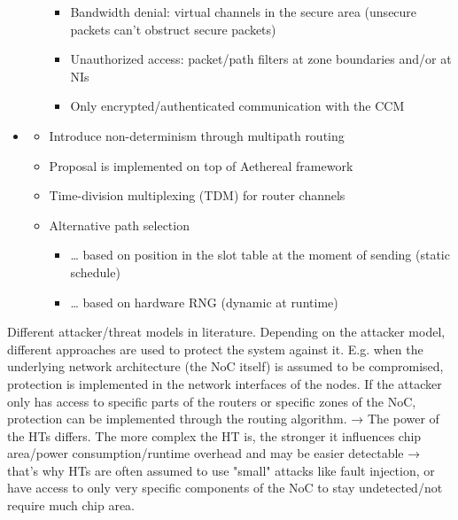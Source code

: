\documentclass[
	paper=a4,
	fontsize=11pt,
	parskip=full %
]{scrreprt}
\begin{document}
\begin{itemize}
\begin{itemize}
                    \begin{itemize}
                        \item Bandwidth denial: virtual channels in the secure area (unsecure packets can't obstruct secure packets)
                        \item Unauthorized access: packet/path filters at zone boundaries and/or at NIs
                        \item Only encrypted/authenticated communication with the CCM
                    \end{itemize}
            \end{itemize}
        \item \textbf{}
            \begin{itemize}
                \item Introduce non-determinism through multipath routing
                \item Proposal is implemented on top of Aethereal framework
                \item Time-division multiplexing (TDM) for router channels
                \item Alternative path selection
                    \begin{itemize}
                        \item … based on position in the slot table at the moment of sending (static schedule)
                        \item … based on hardware RNG (dynamic at runtime)
                    \end{itemize}
            \end{itemize}
    \end{itemize}

    Different attacker/threat models in literature. Depending on the attacker model, different approaches are used to protect the system against it.
    E.g. when the underlying network architecture (the NoC itself) is assumed to be compromised, protection is implemented in the network interfaces
    of the nodes. If the attacker only has access to specific parts of the routers or specific zones of the NoC, protection can be implemented through
    the routing algorithm. → The power of the HTs differs. The more complex the HT is, the stronger it influences chip area/power consumption/runtime
    overhead and may be easier detectable → that's why HTs are often assumed to use "small" attacks like fault injection, or have access to only very
    specific components of the NoC to stay undetected/not require much chip area.
\end{document}
